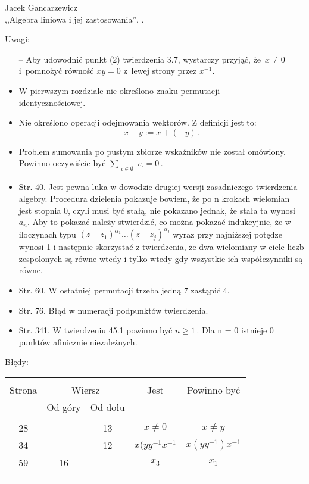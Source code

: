 \begin{center}
  Jacek Gancarzewicz \\
  ,,Algebra liniowa i jej zastosowania'', \cite{Gan04}.
\end{center}

Uwagi:
\begin{itemize}
\item[--]  Aby udowodnić punkt (2) twierdzenia 3.7, wystarczy
  przyjąć, że~$x \neq 0$ i~pomnożyć równość $xy = 0$ z~lewej strony
  przez $x^{ -1 }$.
\item W pierwszym rozdziale nie określono znaku permutacji
  \\identycznościowej.
\item Nie określono operacji odejmowania wektorów. Z definicji jest
  to:$$x - y := x + ( -y ) \, .$$
\item Problem sumowania po pustym zbiorze wskaźników nie został
  omówiony. Powinno oczywiście być $\sum_{ \substack{ \iota \in
      \emptyset } } v_{ \iota } = 0 \, .$
\item Str. 40. Jest pewna luka w dowodzie drugiej wersji zasadniczego
  twierdzenia algebry.  Procedura dzielenia pokazuje bowiem, że po n
  krokach wielomian jest stopnia 0, czyli musi być stałą, nie pokazano
  jednak, że stała ta wynosi $a_{ n }$. Aby to pokazać należy
  stwierdzić, co można pokazać indukcyjnie, że w iloczynach typu $( z
  - z_{ 1 } )^{ \alpha_{ 1 } } \ldots( z - z_{ j } )^{ \alpha_{ j } }$
  wyraz przy najniższej potędze wynosi 1 i następnie skorzystać z
  twierdzenia, że dwa wielomiany w ciele liczb zespolonych są równe
  wtedy i tylko wtedy gdy wszystkie ich współczynniki są równe.
\item Str. 60. W ostatniej permutacji trzeba jedną 7 zastąpić 4.
\item Str. 76. Błąd w numeracji podpunktów twierdzenia.
\item Str. 341. W twierdzeniu 45.1 powinno być $n \geq 1 \, .$ Dla n =
  0 istnieje 0 punktów afinicznie niezależnych.
\end{itemize}

Błędy:\\
\begin{center}
  \begin{tabular}{|c|c|c|c|c|}
    \hline
    & \multicolumn{2}{c|}{} & & \\
    Strona & \multicolumn{2}{c|}{Wiersz}& Jest & Powinno być \\ \cline{2-3}
    & Od góry & Od dołu &  &  \\ \hline
    & & & & \\
    28 & & 13 & $x \neq 0$ & $x \neq y$ \\
    34 & & 12 & $x( y y^{ -1 } x^{ -1 }$ & $x( y y^{ -1 } ) x^{ -1 }$ \\
    59 & 16 & & $x_{ 3 }$ & $x_{ 1 }$ \\
    & & & & \\
    & & & & \\ \hline
  \end{tabular}
\end{center}



